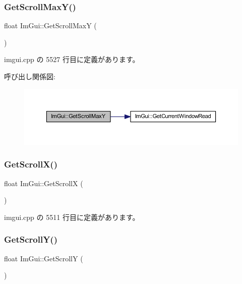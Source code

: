 \subsubsection{\texorpdfstring{Get\+Scroll\+Max\+Y()}{GetScrollMaxY()}}
{\footnotesize\ttfamily float Im\+Gui\+::\+Get\+Scroll\+MaxY (\begin{DoxyParamCaption}{ }\end{DoxyParamCaption})}



 imgui.\+cpp の 5527 行目に定義があります。

呼び出し関係図\+:\nopagebreak
\begin{figure}[H]
\begin{center}
\leavevmode
\includegraphics[width=350pt]{namespace_im_gui_ab34c0d5c63908a7ff50923151730f76a_cgraph}
\end{center}
\end{figure}
\mbox{\label{namespace_im_gui_a6f88335d87da3be81dc6e24cb1812923}} 
\subsubsection{\texorpdfstring{Get\+Scroll\+X()}{GetScrollX()}}
{\footnotesize\ttfamily float Im\+Gui\+::\+Get\+ScrollX (\begin{DoxyParamCaption}{ }\end{DoxyParamCaption})}



 imgui.\+cpp の 5511 行目に定義があります。

\mbox{\label{namespace_im_gui_a3c924a2eeb8b2ddfb40ea17be7ea12a6}} 
\subsubsection{\texorpdfstring{Get\+Scroll\+Y()}{GetScrollY()}}
{\footnotesize\ttfamily float Im\+Gui\+::\+Get\+ScrollY (\begin{DoxyParamCaption}{ }\end{DoxyParamCaption})}



